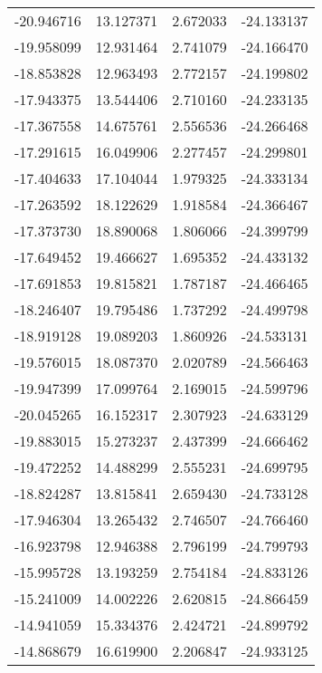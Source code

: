 \begin{tabular}{rrrr}
      -20.946716 &        13.127371 &    2.672033 & -24.133137 \\
      -19.958099 &        12.931464 &    2.741079 & -24.166470 \\
      -18.853828 &        12.963493 &    2.772157 & -24.199802 \\
      -17.943375 &        13.544406 &    2.710160 & -24.233135 \\
      -17.367558 &        14.675761 &    2.556536 & -24.266468 \\
      -17.291615 &        16.049906 &    2.277457 & -24.299801 \\
      -17.404633 &        17.104044 &    1.979325 & -24.333134 \\
      -17.263592 &        18.122629 &    1.918584 & -24.366467 \\
      -17.373730 &        18.890068 &    1.806066 & -24.399799 \\
      -17.649452 &        19.466627 &    1.695352 & -24.433132 \\
      -17.691853 &        19.815821 &    1.787187 & -24.466465 \\
      -18.246407 &        19.795486 &    1.737292 & -24.499798 \\
      -18.919128 &        19.089203 &    1.860926 & -24.533131 \\
      -19.576015 &        18.087370 &    2.020789 & -24.566463 \\
      -19.947399 &        17.099764 &    2.169015 & -24.599796 \\
      -20.045265 &        16.152317 &    2.307923 & -24.633129 \\
      -19.883015 &        15.273237 &    2.437399 & -24.666462 \\
      -19.472252 &        14.488299 &    2.555231 & -24.699795 \\
      -18.824287 &        13.815841 &    2.659430 & -24.733128 \\
      -17.946304 &        13.265432 &    2.746507 & -24.766460 \\
      -16.923798 &        12.946388 &    2.796199 & -24.799793 \\
      -15.995728 &        13.193259 &    2.754184 & -24.833126 \\
      -15.241009 &        14.002226 &    2.620815 & -24.866459 \\
      -14.941059 &        15.334376 &    2.424721 & -24.899792 \\
      -14.868679 &        16.619900 &    2.206847 & -24.933125 \\

\end{tabular}
